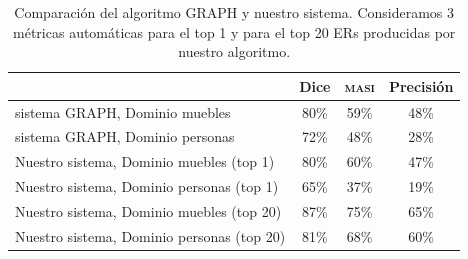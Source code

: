 \begin{table}[H]
\begin{table}[H]
\begin{center}
\begin{tabular}{|l|c|c|c|}
\hline
	 	& 	Dice		&	\textsc{masi}	&	Precisi\'on		\\
\hline
sistema GRAPH, Dominio muebles	& 	80\% 		&	59\%	&	48\%		 	\\
sistema GRAPH, Dominio personas 	& 	72\%		&	48\%	&	28\%			\\
\hline
Nuestro sistema, Dominio muebles (top 1)	&	80\%		&	60\%	&	47\%		\\
Nuestro sistema, Dominio personas (top 1)	&	65\%		&	37\%	&	19\%		\\
\hline
Nuestro sistema, Dominio muebles (top 20)&	87\%		&	75\%  	&	65\%		\\
Nuestro sistema, Dominio personas (top 20)   &	81\%		&68\%	&	60\%		\\
\hline
\end{tabular}
\caption{Comparaci\'on del algoritmo GRAPH y nuestro sistema. Consideramos 3 m\'etricas autom\'aticas para el top 1 y para el top 20 ERs producidas por nuestro algoritmo.}
\label{Tabla_sis_1_20}
\end{center}
\end{table}



\end{table}
